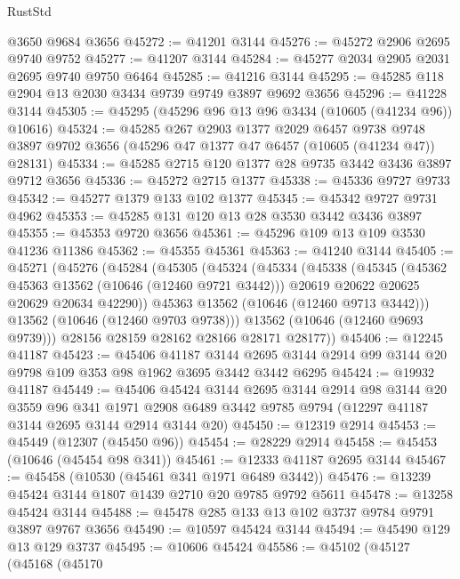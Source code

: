 \begin{lexlean}{RustStd}
\begin{coremodule}
    @3650
    @9684
    @3656
@45272 := @41201 @3144
@45276 := @45272 @2906 @2695 @9740 @9752
@45277 := @41207 @3144
@45284 := @45277 @2034 @2905 @2031 @2695 @9740 @9750 @6464
@45285 := @41216 @3144
@45295 := @45285 @118 @2904 @13 @2030 @3434 @9739 @9749 @3897 @9692 @3656
@45296 := @41228 @3144
@45305 := @45295 (@45296 @96 @13 @96 @3434 (@10605 (@41234 @96)) @10616)
@45324 := @45285
    @267
    @2903
    @1377
    @2029
    @6457
    @9738
    @9748
    @3897
    @9702
    @3656
    (@45296 @47 @1377 @47 @6457 (@10605 (@41234 @47)) @28131)
@45334 := @45285 @2715 @120 @1377 @28 @9735 @3442 @3436 @3897 @9712 @3656
@45336 := @45272 @2715 @1377
@45338 := @45336 @9727 @9733
@45342 := @45277 @1379 @133 @102 @1377
@45345 := @45342 @9727 @9731 @4962
@45353 := @45285 @131 @120 @13 @28 @3530 @3442 @3436 @3897
@45355 := @45353 @9720 @3656
@45361 := @45296 @109 @13 @109 @3530 @41236 @11386
@45362 := @45355 @45361
@45363 := @41240 @3144
@45405 := @45271
    (@45276
      (@45284
        (@45305
          (@45324
            (@45334
              (@45338
                (@45345
                  (@45362 @45363 @13562 (@10646 (@12460 @9721 @3442)))
                  @20619
                  @20622
                  @20625
                  @20629
                  @20634
                  @42290))
              @45363
              @13562
              (@10646 (@12460 @9713 @3442)))
            @13562
            (@10646 (@12460 @9703 @9738)))
          @13562
          (@10646 (@12460 @9693 @9739)))
        @28156
        @28159
        @28162
        @28166
        @28171
        @28177))
@45406 := @12245 @41187
@45423 := @45406
    @41187
    @3144
    @2695
    @3144
    @2914
    @99
    @3144
    @20
    @9798
    @109
    @353
    @98
    @1962
    @3695
    @3442
    @3442
    @6295
@45424 := @19932 @41187
@45449 := @45406
    @45424
    @3144
    @2695
    @3144
    @2914
    @98
    @3144
    @20
    @3559
    @96
    @341
    @1971
    @2908
    @6489
    @3442
    @9785
    @9794
    (@12297 @41187 @3144 @2695 @3144 @2914 @3144 @20)
@45450 := @12319 @2914
@45453 := @45449 (@12307 (@45450 @96))
@45454 := @28229 @2914
@45458 := @45453 (@10646 (@45454 @98 @341))
@45461 := @12333 @41187 @2695 @3144
@45467 := @45458 (@10530 (@45461 @341 @1971 @6489 @3442))
@45476 := @13239 @45424 @3144 @1807 @1439 @2710 @20 @9785 @9792 @5611
@45478 := @13258 @45424 @3144
@45488 := @45478 @285 @133 @13 @102 @3737 @9784 @9791 @3897 @9767 @3656
@45490 := @10597 @45424 @3144
@45494 := @45490 @129 @13 @129 @3737
@45495 := @10606 @45424
@45586 := @45102
    (@45127
      (@45168
        (@45170

\end{coremodule}
\end{lexlean}
